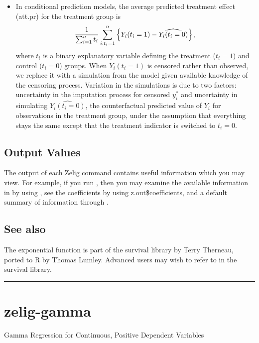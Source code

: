 \documentclass[letterpaper,10pt,english]{sphinxmanual}
\begin{document}
\begin{itemize}
\item {} 
In conditional prediction models, the average predicted treatment
effect (att.pr) for the treatment group is
\begin{gather}
\begin{split}\frac{1}{\sum_{i=1}^n t_i}\sum_{i:t_i=1}^n \left\{ Y_i(t_i=1) -
  \widehat{Y_i(t_i=0)} \right\},\end{split}\notag
\end{gather}
where \(t_i\) is a binary explanatory variable defining the
treatment (\(t_i=1\)) and control (\(t_i=0\)) groups. When
\(Y_i(t_i=1)\) is censored rather than observed, we replace it
with a simulation from the model given available knowledge of the
censoring process. Variation in the simulations is due to two
factors: uncertainty in the imputation process for censored
\(y_i^*\) and uncertainty in simulating
\(\widehat{Y_i(t_i=0)}\), the counterfactual predicted value of
\(Y_i\) for observations in the treatment group, under the
assumption that everything stays the same except that the treatment
indicator is switched to \(t_i=0\).

\end{itemize}


\subsection{Output Values}
\label{vignette:output-values}
The output of each Zelig command contains useful information which you
may view. For example, if you run
, then you may
examine the available information in  by using
, see the coefficients by using z.out\$coefficients, and
a default summary of information through .


\subsection{See also}
\label{vignette:see-also}
The exponential function is part of the survival library by Terry
Therneau, ported to R by Thomas Lumley. Advanced users may wish to refer
to  in the survival library.


\bigskip\hrule{}\bigskip



\section{zelig-gamma}
\label{vignette:zgamma}\label{vignette:zelig-gamma}
Gamma Regression for Continuous, Positive Dependent Variables
\end{document}
